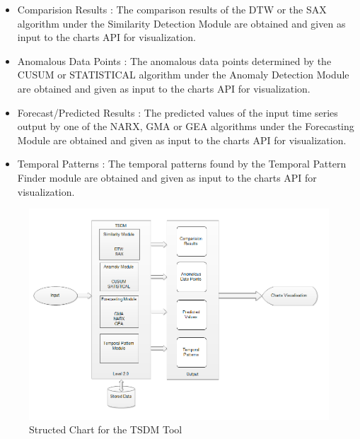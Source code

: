\documentclass[12pt,a4paper]{report}
\begin{document}
\begin{itemize}
\item Comparision Results  : The comparison results of the DTW or the SAX algorithm under the Similarity Detection Module are obtained and given as input to the charts API for visualization.
\item Anomalous Data Points  : The anomalous data points determined by the CUSUM or STATISTICAL algorithm under the Anomaly Detection Module are obtained and given as input to the charts API for visualization.
\item Forecast/Predicted Results  : The predicted values of the input time series output by one of the NARX, GMA or GEA algorithms under the Forecasting Module are obtained and given as input to the charts API for visualization.
\item Temporal Patterns  : The temporal patterns found by the Temporal Pattern Finder module are obtained and given as input to the charts API for visualization.
\end{itemize}
\begin{figure}[h!]
	\centering
		\includegraphics[scale=0.7]{screenshots/dfd_2.png}
		\caption{Structed Chart for the TSDM Tool }
\end{figure}


\pagebreak

\pagebreak
\pagebreak
\end{document}
